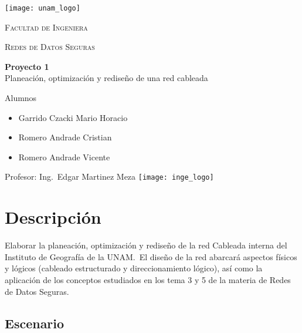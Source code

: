 \documentclass[letterpaper]{article}
\begin{document}
\begin{titlepage}
  \centering
  \texttt{[image: unam\_logo]}\vfill{}
  {\scshape\Huge Facultad de Ingeniera\par}\vspace{0.5cm}
  {\scshape\Large Redes de Datos Seguras\par}\vfill
  {\huge \textbf{Proyecto 1}\\Planeación, optimización y
    rediseño de una red cableada}\vfill
  
  {\Large
    Alumnos\begin{itemize}
    \item Garrido Czacki Mario Horacio
    \item Romero Andrade Cristian
    \item Romero Andrade Vicente

    \end{itemize}
  }\vfill
  {\large Profesor: Ing.~Edgar Martinez Meza}\vfill
  \texttt{[image: inge\_logo]}
  
  
\end{titlepage}

\tableofcontents{}\newpage

\section{Descripción}\label{sec:desc}

Elaborar la planeación, optimización y rediseño de la red Cableada interna del
Instituto de Geografía de la UNAM.\ El diseño de la red abarcará aspectos físicos
y lógicos (cableado estructurado y direccionamiento lógico), así como la
aplicación de los conceptos estudiados en los tema 3 y 5 de la materia de Redes
de Datos Seguras.

\subsection{Escenario}\label{sec:esc}
\end{document}

